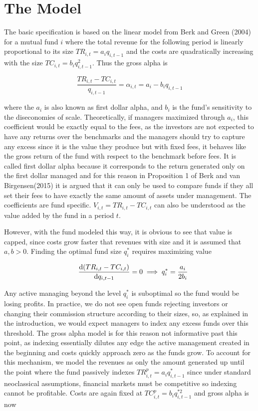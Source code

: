 \documentclass[12pt]{article}
\begin{document}
\section{The Model}
The basic specification is based on the linear model from Berk and Green (2004)\cite{BerkGreen2004} for a mutual fund $i$ where the total revenue for the following period is linearly proportional to its size $TR_{i,t} = a_iq_{i,t-1}$ and the costs are quadratically  increasing with the size $TC_{i,t}=b_iq_{i,t-1}^2$. Thus the gross alpha is

\begin{equation}
    \frac{TR_{i,t}-TC_{i,t}}{q_{i,t-1}}= \alpha_{i,t}=a_i-b_iq_{i,t-1}\label{grosslin}
\end{equation}

where the $a_i$ is also known as first dollar alpha, and $b_i$ is the fund's sensitivity to the diseconomies of scale. Theoretically, if managers maximized through $a_i$, this coefficient would be exactly equal to the fees, as the investors are not expected to have any returns over the benchmarks and the managers should try to capture any excess since it is the value they produce but with fixed fees, it behaves like the gross return of the fund with respect to the benchmark before fees. It is called first dollar alpha because it corresponds to the return generated only on the first dollar managed and for this reason in Proposition 1 of Berk and van Birgensen(2015)\cite{BERK20151} it is argued that it can only be used to compare funds if they all set their fees to have exactly the same amount of assets under management. The coefficients are fund specific. $V_{i,t}=TR_{i,t}-TC_{i,t}$ can also be understood as the value added by the fund in a period $t$.

However, with the fund modeled this way, it is obvious to see that value is capped, since costs grow faster that revenues with size and it is assumed that $a,b>0$. Finding the optimal fund size $q_i^*$ requires maximizing value

$$
    \quad \odv{(TR_{i,t}-TC_{i,t})}{q_{i,t-1}}=0 \implies q_{i}^*=\frac{a_i}{2b_i}
$$

Any active managing beyond the level $q_i^*$ is suboptimal so the fund would be losing profits. In practice, we do not see open funds rejecting investors or changing their commission structure according to their sizes, so, as explained in the introduction, we would expect managers to index any excess funds over this threshold. The gross alpha model is for this reason not informative past this point, as indexing essentially dilutes any edge the active management created in the beginning and costs quickly approach zero as the funds grow. To account for this mechanism, we model the revenues as only the amount generated up until the point where the fund passively indexes $TR_{i,t}^p=a_iq_{i,t-1}^*$ since under standard neoclassical assumptions, financial markets must be competitive so indexing cannot be profitable. Costs are again fixed at $TC_{i,t}^p=b_iq_{i,t-1}^{*2}$ and gross alpha is now
\end{document}

